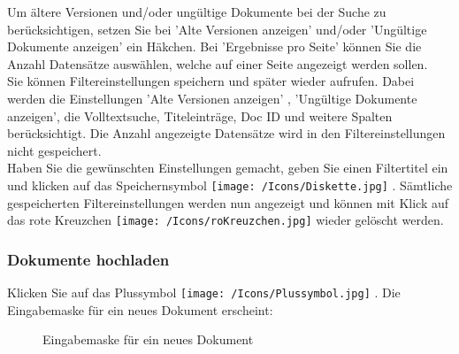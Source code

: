 Um ältere Versionen und/oder ungültige Dokumente bei der Suche zu berücksichtigen, setzen Sie bei 'Alte Versionen anzeigen'  und/oder 'Ungültige Dokumente anzeigen'  ein Häkchen. Bei 'Ergebnisse pro Seite'  können Sie die Anzahl Datensätze auswählen, welche auf einer Seite angezeigt werden sollen.\\
Sie können Filtereinstellungen speichern und später wieder aufrufen. Dabei werden die Einstellungen 'Alte Versionen anzeigen' , 'Ungültige Dokumente anzeigen', die Volltextsuche, Titeleinträge, Doc ID und weitere Spalten berücksichtigt. Die Anzahl angezeigte Datensätze wird in den Filtereinstellungen nicht gespeichert.\\
Haben Sie die gewünschten Einstellungen gemacht, geben Sie einen Filtertitel ein  und klicken auf das Speichernsymbol \texttt{[image: /Icons/Diskette.jpg]} . Sämtliche gespeicherten Filtereinstellungen werden nun angezeigt  und können mit Klick auf das rote Kreuzchen \texttt{[image: /Icons/roKreuzchen.jpg]}  wieder gelöscht werden.


\subsubsection{Dokumente hochladen}
\label{bkm:Ref442863508}\label{bkm:Ref442787515}\label{bkm:Ref442778397}\label{bkm:Ref442770648}\label{bkm:Ref442769978}

\begin{figure}[H]
\end{figure}

Klicken Sie auf das Plussymbol \texttt{[image: /Icons/Plussymbol.jpg]} . Die Eingabemaske für ein neues Dokument erscheint:

\begin{figure}[H]
\caption{Eingabemaske für ein neues Dokument}
\end{figure}

